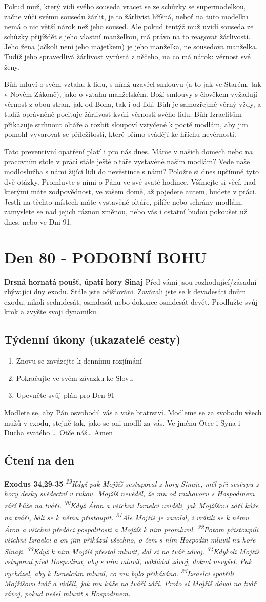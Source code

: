 \documentclass[11pt]{article}
\newcommand{\zacatekDvanactyTyden}{
\textbf{Drsná hornatá poušť, úpatí hory Sinaj} \newline 
Před vámi jsou rozhodující/zásadní zbývající dny exodu. Stále jste očišťováni. Zavázali jste se k devadesáti dnům exodu, nikoli sedmdesát, osmdesát nebo dokonce osmdesát devět. Prodlužte svůj krok a zvyšte svoji dynamiku.

\subsection*{Týdenní úkony (ukazatelé cesty)}
\begin{enumerate}
  \item Znovu se zavázejte k dennímu rozjímání
  \item Pokračujte ve svém závazku ke Slovu
  \item Upevněte svůj plán pro Den 91
\end{enumerate}
Modlete se, aby Pán osvobodil vás a vaše bratrství. \newline
Modleme se za svobodu všech mužů v exodu, stejně tak, jako se oni modlí za vás.\newline
Ve jménu Otce i Syna i Ducha svatého …  Otče náš… Amen
}
\begin{document}
Pokud muž, který vidí svého souseda vracet se ze schůzky se supermodelkou, začne vůči svému sousedu žárlit, je to žárlivist
hříšná, neboť na tuto modelku nemá o nic větší nárok než jeho soused. Ale pokud tentýž muž uvidí souseda ze schůzky přijíždět s
jeho vlastní manželkou, má právo na to reagovat žárlivostí. Jeho žena (ačkoli není jeho majetkem) je jeho manželka, ne sousedova
manželka. Tudíž jeho spravedlivá žárlivost vyrůstá z něčeho, na co má nárok: věrnost své ženy.

Bůh mluví o svém vztahu k lidu, s nímž uzavřel smlouvu (a to jak ve Starém, tak v Novém Zákoně), jako o vztahu manželském.
Boží smlouvy s člověkem vyžadují věrnost z obou stran, jak od Boha, tak i od lidí. Bůh je samozřejmě věrný vždy, a tudíž
oprávněně pociťuje žárlivost kvůli věrnosti svého lidu. Bůh Izraelitům přikazuje strhnout oltáře a rozbít sloupoví vztyčené k poctě
modlám, aby jim pomohl vyvarovat se příležitostí, které přímo svádějí ke hříchu nevěrnosti.

Tato preventivní opatření platí i pro nás dnes. Máme v našich domech nebo na pracovním stole v práci stále ještě oltáře vystavěné
našim modlám? Vede naše modloslužba s námi žijící lidi do nevěstince s námi? Položte si dnes upřímně tyto dvě otázky.
Promluvte s nimi o Pánu ve své svaté hodince. Všímejte si věcí, nad kterými máte zodpovědnost, ve vašem domě, až pojedete
autem, budete v práci. Jestli na těchto místech máte vystavěné oltáře, pilíře nebo schrány modlám, zamyslete se nad jejich ráznou
změnou, nebo vás i ostatní budou pokoušet už dnes, nebo ve Dni 91.


\newpage
\section{Den 80 - PODOBNÍ BOHU}
\zacatekDvanactyTyden
\subsection*{Čtení na den}
\textbf{Exodus 34,29-35}
\newline
\textit{
\textsuperscript{29}Když pak Mojžíš sestupoval z hory Sínaje, měl při sestupu z hory desky svědectví v rukou. Mojžíš nevěděl, že mu od rozhovoru s Hospodinem září kůže na tváři.
\textsuperscript{30}Když Áron a všichni Izraelci uviděli, jak Mojžíšovi září kůže na tváři, báli se k němu přistoupit.
\textsuperscript{31}Ale Mojžíš je zavolal, i vrátili se k němu Áron a všichni předáci pospolitosti a Mojžíš k nim promluvil.
\textsuperscript{32}Potom přistoupili všichni Izraelci a on jim přikázal všechno, o čem s ním Hospodin mluvil na hoře Sínaji.
\textsuperscript{33}Když k nim Mojžíš přestal mluvit, dal si na tvář závoj.
\textsuperscript{34}Kdykoli Mojžíš vstupoval před Hospodina, aby s ním mluvil, odkládal závoj, dokud nevyšel. Pak vycházel, aby k Izraelcům mluvil, co mu bylo přikázáno.
\textsuperscript{35}Izraelci spatřili Mojžíšovu tvář a viděli, jak mu kůže na tváři září. Proto si Mojžíš dával na tvář závoj, pokud nešel mluvit s Hospodinem.
}
\end{document}
